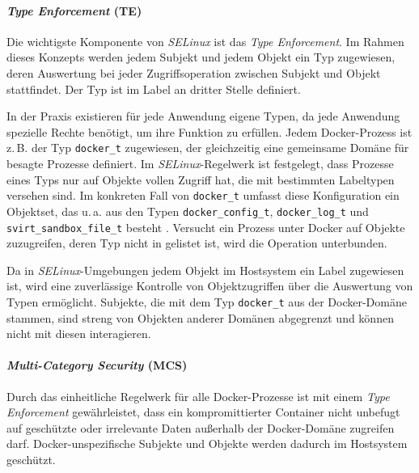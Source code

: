 \documentclass[../main.tex]{subfiles}
\begin{document}

				\paragraph{\emph{Type Enforcement} (\acrshort{TE})}
					Die wichtigste Komponente von \emph{SELinux} ist das \emph{Type Enforcement}. Im Rahmen dieses Konzepts werden jedem Subjekt und jedem Objekt ein Typ zugewiesen, deren Auswertung bei jeder Zugriffsoperation zwischen Subjekt und Objekt stattfindet. Der Typ ist im Label an dritter Stelle definiert.

					In der Praxis existieren für jede Anwendung eigene Typen, da jede Anwendung spezielle Rechte benötigt, um ihre Funktion zu erfüllen. Jedem Docker-Prozess ist z.\,B. der Typ \texttt{docker\_t} zugewiesen, der gleichzeitig eine gemeinsame Domäne für besagte Prozesse definiert. Im \emph{SELinux}-Regelwerk ist festgelegt, dass Prozesse eines Typs nur auf Objekte vollen Zugriff hat, die mit bestimmten Labeltypen versehen sind. Im konkreten Fall von \texttt{docker\_t} umfasst diese Konfiguration ein Objektset, das u.\,a. aus den Typen \texttt{docker\_config\_t}, \texttt{docker\_log\_t} und \texttt{svirt\_sandbox\_file\_t} besteht \cite{githubSELinuxProfileTE}. Versucht ein Prozess unter Docker auf Objekte zuzugreifen, deren Typ nicht in \cite{githubSELinuxProfileTE} gelistet ist, wird die Operation unterbunden.

					Da in \emph{SELinux}-Umgebungen jedem Objekt im Hostsystem ein Label zugewiesen ist, wird eine zuverlässige Kontrolle von Objektzugriffen über die Auswertung von Typen ermöglicht. Subjekte, die mit dem Typ \texttt{docker\_t} aus der Docker-Domäne stammen, sind streng von Objekten anderer Domänen abgegrenzt und können nicht mit diesen interagieren.

				\clearpage

				\paragraph{\emph{Multi-Category Security} (\acrshort{MCS})}
					Durch das einheitliche Regelwerk für alle Docker-Prozesse ist mit einem \emph{Type Enforcement} gewährleistet, dass ein kompromittierter Container \cbroken{} nicht unbefugt auf geschützte oder irrelevante Daten außerhalb der Docker-Domäne  zugreifen darf. Docker-unspezifische Subjekte und Objekte werden dadurch im Hostsystem geschützt.
\end{document}
